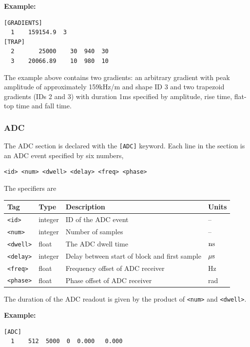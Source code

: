 \documentclass{article}
\begin{document}
\begin{minipage}{\textwidth}
\textbf{Example:}
\begin{lstlisting}
[GRADIENTS]
  1    159154.9  3
[TRAP]
  2       25000    30  940  30
  3    20066.89    10  980  10
\end{lstlisting}
\end{minipage}

The example above contains two gradients: an arbitrary gradient with peak amplitude of approximately 159kHz/m and shape ID 3 and two trapezoid gradients (IDs 2 and 3) with duration 1ms specified by amplitude, rise time, flat-top time and fall time.

\subsubsection{ADC}
The ADC section is declared with the \verb.[ADC]. keyword. Each line in the section is an ADC event specified by six numbers,
\begin{lstlisting}
<id> <num> <dwell> <delay> <freq> <phase>
\end{lstlisting}

The specifiers are

\begin{tabularx}{\textwidth}{llXl}
\toprule
Tag & Type & Description & Units\\
\midrule
\verb.<id>. & integer & ID of the ADC event & -- \\
\verb.<num>. & integer & Number of samples & -- \\
\verb.<dwell>. & float & The ADC dwell time & $\rm n s$ \\
\verb.<delay>. & integer & Delay between start of block and first sample & $\rm \mu s$  \\
\verb.<freq>. & float & Frequency offset of ADC receiver & Hz \\
\verb.<phase>. & float & Phase offset of ADC receiver & rad \\
\bottomrule
\end{tabularx}

The duration of the ADC readout is given by the product of \verb.<num>. and \verb.<dwell>..

\begin{minipage}{\textwidth}
\textbf{Example:}
\begin{lstlisting}
[ADC]
  1    512  5000  0  0.000   0.000
\end{lstlisting}
\end{minipage}
\end{document}
